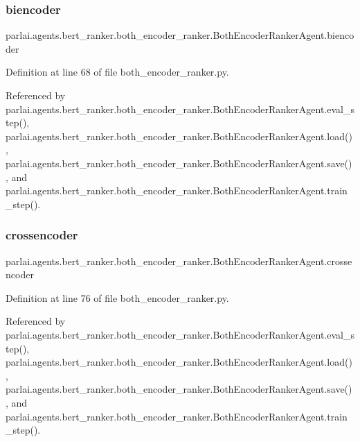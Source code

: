 \subsubsection{\texorpdfstring{biencoder}{biencoder}}
{\footnotesize\ttfamily parlai.\+agents.\+bert\+\_\+ranker.\+both\+\_\+encoder\+\_\+ranker.\+Both\+Encoder\+Ranker\+Agent.\+biencoder}



Definition at line 68 of file both\+\_\+encoder\+\_\+ranker.\+py.



Referenced by parlai.\+agents.\+bert\+\_\+ranker.\+both\+\_\+encoder\+\_\+ranker.\+Both\+Encoder\+Ranker\+Agent.\+eval\+\_\+step(), parlai.\+agents.\+bert\+\_\+ranker.\+both\+\_\+encoder\+\_\+ranker.\+Both\+Encoder\+Ranker\+Agent.\+load(), parlai.\+agents.\+bert\+\_\+ranker.\+both\+\_\+encoder\+\_\+ranker.\+Both\+Encoder\+Ranker\+Agent.\+save(), and parlai.\+agents.\+bert\+\_\+ranker.\+both\+\_\+encoder\+\_\+ranker.\+Both\+Encoder\+Ranker\+Agent.\+train\+\_\+step().

\mbox{\label{classparlai_1_1agents_1_1bert__ranker_1_1both__encoder__ranker_1_1BothEncoderRankerAgent_a7ad0e098a0dd8278caa7ed77e147bfb1}} 
\subsubsection{\texorpdfstring{crossencoder}{crossencoder}}
{\footnotesize\ttfamily parlai.\+agents.\+bert\+\_\+ranker.\+both\+\_\+encoder\+\_\+ranker.\+Both\+Encoder\+Ranker\+Agent.\+crossencoder}



Definition at line 76 of file both\+\_\+encoder\+\_\+ranker.\+py.



Referenced by parlai.\+agents.\+bert\+\_\+ranker.\+both\+\_\+encoder\+\_\+ranker.\+Both\+Encoder\+Ranker\+Agent.\+eval\+\_\+step(), parlai.\+agents.\+bert\+\_\+ranker.\+both\+\_\+encoder\+\_\+ranker.\+Both\+Encoder\+Ranker\+Agent.\+load(), parlai.\+agents.\+bert\+\_\+ranker.\+both\+\_\+encoder\+\_\+ranker.\+Both\+Encoder\+Ranker\+Agent.\+save(), and parlai.\+agents.\+bert\+\_\+ranker.\+both\+\_\+encoder\+\_\+ranker.\+Both\+Encoder\+Ranker\+Agent.\+train\+\_\+step().


